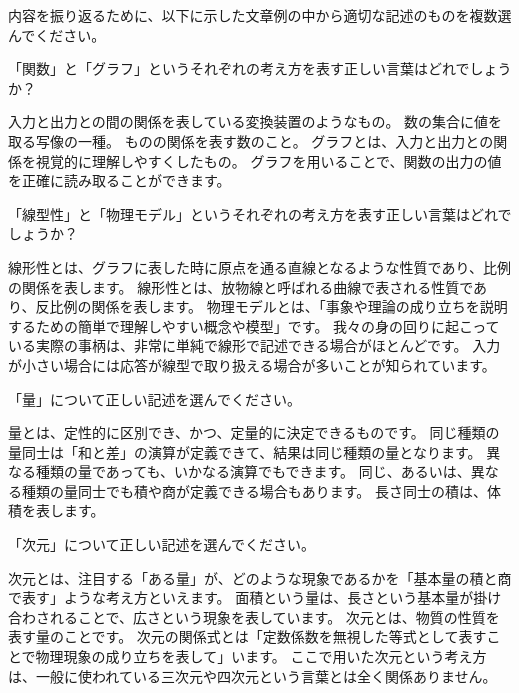 \documentclass[uplatex,dvipdfmx,a4paper,11pt]{jsarticle}
\begin{document}
内容を振り返るために、以下に示した文章例の中から適切な記述のものを複数選んでください。
\begin{qlist}
	\qitem 「関数」と「グラフ」というそれぞれの考え方を表す正しい言葉はどれでしょうか？
		\begin{qlist2}
			\qitem 入力と出力との間の関係を表している変換装置のようなもの。
			\qitem 数の集合に値を取る写像の一種。
			\qitem ものの関係を表す数のこと。
      \qitem グラフとは、入力と出力との関係を視覚的に理解しやすくしたもの。
      \qitem グラフを用いることで、関数の出力の値を正確に読み取ることができます。
    \end{qlist2}
    \vspace{3mm}
	\qitem 「線型性」と「物理モデル」というそれぞれの考え方を表す正しい言葉はどれでしょうか？
		\begin{qlist2}
			\qitem 線形性とは、グラフに表した時に原点を通る直線となるような性質であり、比例の関係を表します。
			\qitem 線形性とは、放物線と呼ばれる曲線で表される性質であり、反比例の関係を表します。
			\qitem 物理モデルとは、「事象や理論の成り立ちを説明するための簡単で理解しやすい概念や模型」です。
			\qitem 我々の身の回りに起こっている実際の事柄は、非常に単純で線形で記述できる場合がほとんどです。
			\qitem 入力が小さい場合には応答が線型で取り扱える場合が多いことが知られています。
    \end{qlist2}
    \vspace{3mm}
	\qitem 「量」について正しい記述を選んでください。
		\begin{qlist2}
			\qitem 量とは、定性的に区別でき、かつ、定量的に決定できるものです。
			\qitem 同じ種類の量同士は「和と差」の演算が定義できて、結果は同じ種類の量となります。
			\qitem 異なる種類の量であっても、いかなる演算でもできます。
			\qitem 同じ、あるいは、異なる種類の量同士でも積や商が定義できる場合もあります。
			\qitem 長さ同士の積は、体積を表します。
    \end{qlist2}
    \vspace{3mm}
	\qitem 「次元」について正しい記述を選んでください。
		\begin{qlist2}
			\qitem 次元とは、注目する「ある量」が、どのような現象であるかを「基本量の積と商で表す」ような考え方といえます。
			\qitem 面積という量は、長さという基本量が掛け合わされることで、広さという現象を表しています。
			\qitem 次元とは、物質の性質を表す量のことです。
      \qitem 次元の関係式とは「定数係数を無視した等式として表すことで物理現象の成り立ちを表して」います。
      \qitem ここで用いた次元という考え方は、一般に使われている三次元や四次元という言葉とは全く関係ありません。

\end{qlist2}
\end{qlist}
\end{document}
